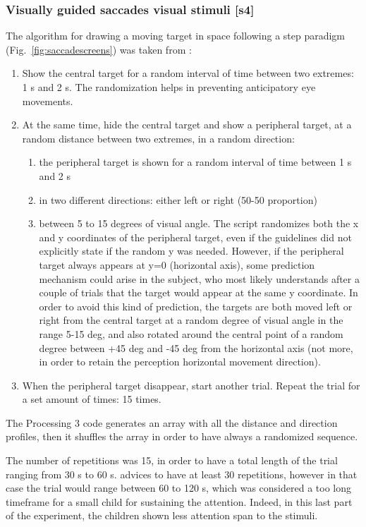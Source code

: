 \subsubsection{Visually guided saccades visual stimuli [s4]}
\label{sec:expsaccades}

The algorithm for drawing a moving target in space following a step paradigm (Fig.~\ref{fig:saccadescreens}) was taken from \cite{zalla2016saccades}:
\begin{enumerate}
    \item Show the central target for a random interval of time between two extremes: 1 s and 2 s. The randomization helps in preventing anticipatory eye movements.
    \item At the same time, hide the central target and show a peripheral target, at a random distance between two extremes, in a random direction:
    \begin{enumerate}[label*=\arabic*.]
        \item the peripheral target is shown for a random interval of time between 1 s and 2 s
        \item in two different directions: either left or right (50-50 proportion)
        \item between 5 to 15 degrees of visual angle. The script randomizes both the x and y coordinates of the peripheral target, even if the guidelines did not explicitly state if the random y was needed. However, if the peripheral target always appears at y=0 (horizontal axis), some prediction mechanism could arise in the subject, who most likely understands after a couple of trials that the target would appear at the same y coordinate. In order to avoid this kind of prediction, the targets are both moved left or right from the central target at a random degree of visual angle in the range 5-15 deg, and also rotated around the central point of a random degree between +45 deg and -45 deg from the horizontal axis (not more, in order to retain the perception horizontal movement direction). 
    \end{enumerate}
    \item When the peripheral target disappear, start another trial. Repeat the trial for a set amount of times: 15 times.
\end{enumerate}

The Processing 3 code generates an array with all the distance and direction profiles, then it shuffles the array in order to have always a randomized sequence.

The number of repetitions was 15, in order to have a total length of the trial ranging from 30 s to 60 s. \cite{smyrnis2008guidelines} advices to have at least 30 repetitions, however in that case the trial would range between 60 to 120 s, which was considered a too long timeframe for a small child for sustaining the attention. Indeed, in this last part of the experiment, the children shown less attention span to the stimuli.

